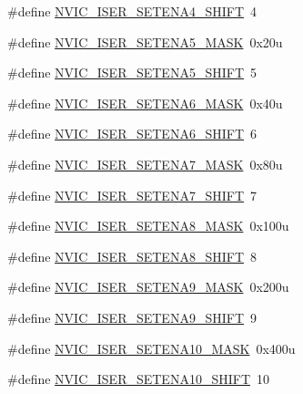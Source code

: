 \begin{DoxyCompactItemize}
\#define \hyperlink{group___n_v_i_c___register___masks_gaa9f4517a9e5e14414b591bf558fb892f}{N\+V\+I\+C\+\_\+\+I\+S\+E\+R\+\_\+\+S\+E\+T\+E\+N\+A4\+\_\+\+S\+H\+I\+FT}~4
\item 
\#define \hyperlink{group___n_v_i_c___register___masks_ga7afcd583b7c3508c28361c4c1282abfa}{N\+V\+I\+C\+\_\+\+I\+S\+E\+R\+\_\+\+S\+E\+T\+E\+N\+A5\+\_\+\+M\+A\+SK}~0x20u
\item 
\#define \hyperlink{group___n_v_i_c___register___masks_ga676fb18a5f74e3b78267ac2fff8aa500}{N\+V\+I\+C\+\_\+\+I\+S\+E\+R\+\_\+\+S\+E\+T\+E\+N\+A5\+\_\+\+S\+H\+I\+FT}~5
\item 
\#define \hyperlink{group___n_v_i_c___register___masks_gafbd90e6755f2c0cae8e08d7f2c781146}{N\+V\+I\+C\+\_\+\+I\+S\+E\+R\+\_\+\+S\+E\+T\+E\+N\+A6\+\_\+\+M\+A\+SK}~0x40u
\item 
\#define \hyperlink{group___n_v_i_c___register___masks_gac5598f21e8adbd9cce4ba0c67d34b6a1}{N\+V\+I\+C\+\_\+\+I\+S\+E\+R\+\_\+\+S\+E\+T\+E\+N\+A6\+\_\+\+S\+H\+I\+FT}~6
\item 
\#define \hyperlink{group___n_v_i_c___register___masks_gaf62d5f832f14f27c961333d4dfaedca3}{N\+V\+I\+C\+\_\+\+I\+S\+E\+R\+\_\+\+S\+E\+T\+E\+N\+A7\+\_\+\+M\+A\+SK}~0x80u
\item 
\#define \hyperlink{group___n_v_i_c___register___masks_ga74d6aebe11b8bf6d0ad18b2469bca87c}{N\+V\+I\+C\+\_\+\+I\+S\+E\+R\+\_\+\+S\+E\+T\+E\+N\+A7\+\_\+\+S\+H\+I\+FT}~7
\item 
\#define \hyperlink{group___n_v_i_c___register___masks_ga8f862711598597c198266b692fb8d9df}{N\+V\+I\+C\+\_\+\+I\+S\+E\+R\+\_\+\+S\+E\+T\+E\+N\+A8\+\_\+\+M\+A\+SK}~0x100u
\item 
\#define \hyperlink{group___n_v_i_c___register___masks_ga25680a68a6a8fd3f61dfab58644a1b1e}{N\+V\+I\+C\+\_\+\+I\+S\+E\+R\+\_\+\+S\+E\+T\+E\+N\+A8\+\_\+\+S\+H\+I\+FT}~8
\item 
\#define \hyperlink{group___n_v_i_c___register___masks_ga7ac109cc274b391428d15abaad4bbb8c}{N\+V\+I\+C\+\_\+\+I\+S\+E\+R\+\_\+\+S\+E\+T\+E\+N\+A9\+\_\+\+M\+A\+SK}~0x200u
\item 
\#define \hyperlink{group___n_v_i_c___register___masks_gaca210644458bb85d671b4c162f11dcba}{N\+V\+I\+C\+\_\+\+I\+S\+E\+R\+\_\+\+S\+E\+T\+E\+N\+A9\+\_\+\+S\+H\+I\+FT}~9
\item 
\#define \hyperlink{group___n_v_i_c___register___masks_ga798ab9ce5ab61184ce4dfe862bda1d56}{N\+V\+I\+C\+\_\+\+I\+S\+E\+R\+\_\+\+S\+E\+T\+E\+N\+A10\+\_\+\+M\+A\+SK}~0x400u
\item 
\#define \hyperlink{group___n_v_i_c___register___masks_ga469668de42ac2ef67322c117bbb58d6e}{N\+V\+I\+C\+\_\+\+I\+S\+E\+R\+\_\+\+S\+E\+T\+E\+N\+A10\+\_\+\+S\+H\+I\+FT}~10

\end{DoxyCompactItemize}
